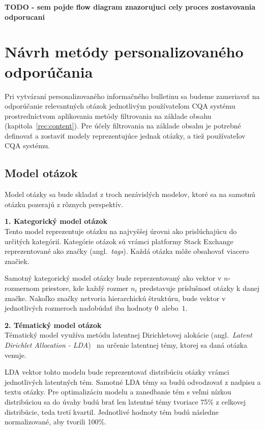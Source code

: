 \textbf{TODO - sem pojde flow diagram znazorujuci cely proces zostavovania odporucani}\label{fig:overview}

\section{Návrh metódy personalizovaného odporúčania}


Pri vytváraní personalizovaného informačného bulletinu sa budeme zameriavať na odporúčanie relevantných otázok jednotlivým
používateľom CQA systému prostredníctvom aplikovania metódy filtrovania na základe obsahu (kapitola~\ref{rec:content}).
Pre účely filtrovania na základe obsahu je potrebné definovať a zostaviť modely reprezentujúce jednak otázky, a tiež
používateľov CQA systému.

\subsection{Model otázok}

Model otázky sa bude skladať z troch nezávislých modelov, ktoré sa na samotnú otázku pozerajú z rôznych perspektív.

\textbf{1. Kategorický model otázok}\\
Tento model reprezentuje otázku na najvyššej úrovni ako prislúchajúcu do určitých kategórií. Kategórie otázok sú vrámci
platformy Stack Exchange reprezentované ako značky (angl.~\textit{tags}). Každá otázka môže obsahovať viacero značiek.

Samotný kategorický model otázky bude reprezentovaný ako vektor v $n$-rozmernom priestore, kde každý rozmer $n_i$
predstavuje príslušnosť otázky k danej značke. Nakoľko značky netvoria hierarchickú štruktúru, bude vektor v jednotlivých
rozmeroch nadobúdať iba hodnoty $0$~alebo~$1$.

\textbf{2. Tématický model otázok}\\
Tématický model využíva metódu latentnej Dirichletovej alokácie (angl.~\emph{Latent Dirichlet Allocation - LDA})~\cite{blei2003latent}
na určenie latentnej témy, ktorej sa daná otázka venuje.

LDA vektor tohto modelu bude reprezentovať distribúciu otázky vrámci jednotlivých latentných tém.
Samotné LDA témy sa budú odvodzovať z nadpisu a textu otázky.
Pre optimalizáciu modelu a zanedbanie tém s veľmi nízkou distribúciou sa do úvahy budú brať len latentné témy tvoriace
75\% z celkovej distribúcie, teda tretí kvartil. Jednotlivé hodnoty tém budú následne normalizované, aby tvorili 100\%.

